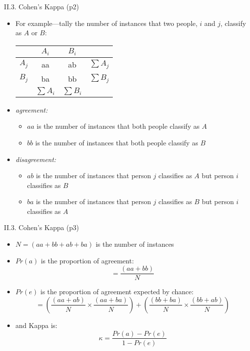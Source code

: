 \documentclass[handout]{beamer}
\begin{document}
\begin{frame}{II.3. Cohen's Kappa (p2)}
\begin{itemize}
\item For example---tally the number of instances that two people, $i$ and $j$, classify as $A$ or $B$:\\
\begin{center}
\begin{tabular}{r||c|c||c}
      & $A_i$       & $B_i$       & \\
\hline
\hline
$A_j$ & aa          &  ab         & $\sum{A_j}$ \\
\hline
$B_j$ & ba          &  bb         & $\sum{B_j}$ \\
\hline
\hline
      & $\sum{A_i}$ & $\sum{B_i}$ & \\
\end{tabular}
\end{center}
\item \emph{agreement:}
	\begin{itemize}
	\item $aa$ is the number of instances that both people classify as $A$
	\item $bb$ is the number of instances that both people classify as $B$
	\end{itemize}
\item \emph{disagreement:}
	\begin{itemize}
	\item $ab$ is the number of instances that person $j$ classifies as $A$ but person $i$ classifies as $B$
	\item $ba$ is the number of instances that person $j$ classifies as $B$ but person $i$ classifies as $A$
	\end{itemize}
\end{itemize}
\end{frame}
\begin{frame}{II.3. Cohen's Kappa (p3)}
\begin{itemize}
\item $N = (aa + bb + ab + ba)$ is the number of instances
\item $Pr(a)$ is the proportion of agreement:
\[
= \frac{(aa + bb)}{N}
\]
\item $Pr(e)$ is the proportion of agreement expected by chance:
\[
= \left(\frac{(aa + ab)}{N} \times \frac{(aa + ba)}{N} \right) + \left(\frac{(bb + ba)}{N} \times \frac{(bb + ab)}{N}\right)
\]
\item and Kappa is:
\[
\kappa = \frac{ Pr(a) - Pr(e) }{ 1 - Pr(e) }
\]
\end{itemize}
\end{frame}
\end{document}
